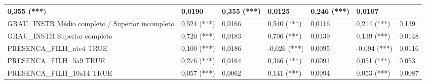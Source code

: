 \begin{landscape}
\begin{table}[htb]
{\begin{tabular}{P{6.00cm} P{3.0cm} P{2.0cm} P{3.0cm} P{2.0cm} P{3.0cm} P{2.0cm}}
				0,355 (***)&
				0,0190&
				0,355 (***)&
				0,0125&				
				0,246 (***)&
				0,0107\\	
			\midrule
				GRAU\_INSTR Médio completo / Superior incompleto& 
				0,524 (***)&
				0,0166&
				0,540 (***)&
				0,0116&				
				0,214 (***)&
				0,139\\	
			\midrule
				GRAU\_INSTR Superior completo& 
				0,720 (***)&
				0,0183&
				0,706 (***)&
				0,0139&				
				0,139 (***)&
				0,0148\\	
			\midrule
				PRESENCA\_FILH\_ate4 TRUE& 
				0,100 (***)&
				0,0186&
				-0,026 (***)&
				0,0095&				
				-0,094 (***)&
				0,0116\\	
			\midrule
				PRESENCA\_FILH\_5a9 TRUE& 
				0,276 (***)&
				0,0164&
				0,366 (***)&
				0,0091&				
				0,051 (***)&
				0,053\\	
			\midrule
				PRESENCA\_FILH\_10a14 TRUE& 
				0,057 (***)&
				0,0062&
				0,141 (***)&
				0,0094&				
				0,053 (***)&
				0,0087\\	
			\bottomrule	
		\end{tabular}
    }{%
	}
\end{table}


\end{landscape}
